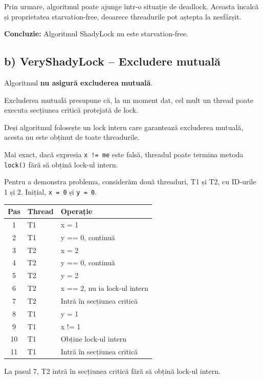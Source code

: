 \documentclass[12pt,a4paper]{article}
\begin{document}
Prin urmare, algoritmul poate ajunge
într-o situație de deadlock.
Aceasta încalcă și proprietatea
starvation-free, deoarece threadurile
pot aștepta la nesfârșit.

\textbf{Concluzie:} Algoritmul ShadyLock
nu este starvation-free.

\subsection*{b) VeryShadyLock -- Excludere mutuală}

Algoritmul \textbf{nu asigură excluderea mutuală}.

Excluderea mutuală presupune că, la un moment
dat, cel mult un thread poate executa
secțiunea critică protejată de lock.

Deși algoritmul folosește un lock intern
care garantează excluderea mutuală,
acesta nu este obținut de toate threadurile.

Mai exact, dacă expresia
\texttt{x != me} este falsă,
threadul poate termina metoda
\texttt{lock()} fără să obțină
lock-ul intern.

Pentru a demonstra problema, considerăm
două threaduri, T1 și T2, cu ID-urile 1 și 2.
Inițial, \texttt{x = 0} și \texttt{y = 0}.

\begin{center}
\begin{tabular}{|c|l|l|}
\hline
Pas & Thread & Operație \\ \hline
1 & T1 & x = 1 \\ \hline
2 & T1 & y == 0, continuă \\ \hline
3 & T2 & x = 2 \\ \hline
4 & T2 & y == 0, continuă \\ \hline
5 & T2 & y = 2 \\ \hline
6 & T2 & x == 2, nu ia lock-ul intern \\ \hline
7 & T2 & Intră în secțiunea critică \\ \hline
8 & T1 & y = 1 \\ \hline
9 & T1 & x != 1 \\ \hline
10 & T1 & Obține lock-ul intern \\ \hline
11 & T1 & Intră în secțiunea critică \\ \hline
\end{tabular}
\end{center}

La pasul 7, T2 intră în secțiunea
critică fără să obțină lock-ul intern.
\end{document}
